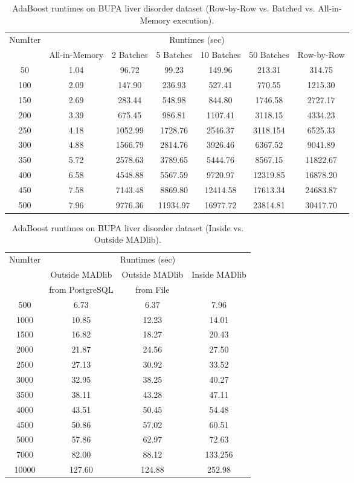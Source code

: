 \begin{table}[!htbp]
\small
\centering
\begin{tabular}{|c|c|c|c|c|c|c|}
\hline
\multirow{2}{*}{NumIter} & \multicolumn{6}{|c|}{Runtimes (sec)}\\
\cline{2-7}
& All-in-Memory & 2 Batches & 5 Batches & 10 Batches & 50 Batches & Row-by-Row\\
\hline
50 &1.04 &96.72 &99.23 &149.96 &213.31 &314.75 \\
\hline
100 &2.09 &147.90 &236.93 &527.41 &770.55 &1215.30 \\
\hline
150 &2.69 &283.44 &548.98 &844.80 &1746.58 &2727.17 \\ 
\hline
200 &3.39 &675.45 &986.81 &1107.41 &3118.15 &4334.23 \\ 
\hline
250 &4.18 &1052.99 &1728.76 &2546.37 &3118.154 &6525.33 \\ 
\hline
300 &4.88 &1566.79 &2814.76 &3926.46 &6367.52 &9041.89 \\ 
\hline
350 &5.72 &2578.63 &3789.65 &5444.76 &8567.15 &11822.67 \\ 
\hline
400 &6.58 &4548.88 &5567.59 &9720.97 &12319.85 &16878.20 \\ 
\hline
450 &7.58 &7143.48 &8869.80 &12414.58 &17613.34 &24683.87 \\ 
\hline
500 &7.96 &9776.36 &11934.97 &16977.72 &23814.81 &30417.70 \\
\hline
\end{tabular}
\caption{AdaBoost runtimes on BUPA liver disorder dataset (Row-by-Row vs. Batched vs. All-in-Memory execution).}
\label{tab:adaBupa1}
\end{table}

\begin{table}[!htbp]
\small
\centering
\begin{tabular}{|c|c|c|c|}
\hline
\multirow{3}{*}{NumIter}&\multicolumn{3}{|c|}{Runtimes (sec)}\\
\cline{2-4}
&Outside MADlib&Outside MADlib&\multirow{2}{*}{Inside MADlib}\\
&from PostgreSQL&from File&\\
\hline
500&6.73 &6.37 &7.96 \\
\hline
1000&10.85 &12.23 &14.01 \\\hline
1500&16.82 &18.27 &20.43 \\\hline
2000&21.87 &24.56 &27.50 \\\hline
2500&27.13 &30.92 &33.52 \\\hline
3000&32.95 &38.25 &40.27 \\\hline
3500&38.11 &43.28 &47.11 \\\hline
4000&43.51 &50.45 &54.48 \\\hline
4500&50.86 &57.02 &60.51 \\\hline
5000&57.86 &62.97 &72.63 \\\hline
7000&82.00 &88.12 &133.256 \\\hline
10000&127.60 &124.88 &252.98 \\
\hline
\end{tabular}
\caption{AdaBoost runtimes on BUPA liver disorder dataset (Inside vs. Outside MADlib).}
\label{tab:adaBupa2}
\end{table}


